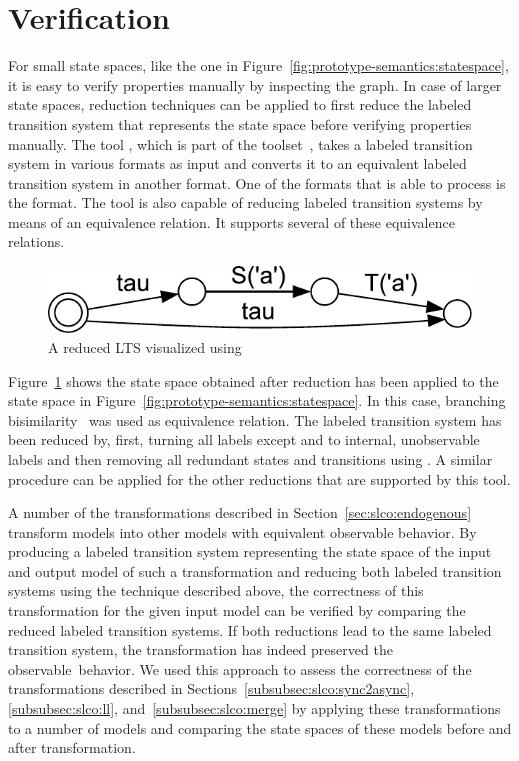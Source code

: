 \section{Verification}
\label{sec:prototype-semantics:verification}

For small state spaces, like the one in Figure~\ref{fig:prototype-semantics:statespace}, it is easy to verify properties manually by inspecting the graph.
In case of larger state spaces, reduction techniques can be applied to first reduce the labeled transition system that represents the state space before verifying properties manually.
The tool \ltsconvert, which is part of the \mCRLTwo toolset~\cite{mcrl2}, takes a labeled transition system in various formats as input and converts it to an equivalent labeled transition system in another format.
One of the formats that \ltsconvert is able to process is the \DOT format.
The tool is also capable of reducing labeled transition systems by means of an equivalence relation.
It supports several of these equivalence relations.

\begin{figure}[hbt]
  \centering
  \includegraphics[scale=.4]{prototype-semantics/figs/statespace_reduced}
  \caption{A reduced LTS visualized using \DOT}
  \label{fig:prototype-semantics:statespace_reduced}
\end{figure}

Figure~\ref{fig:prototype-semantics:statespace_reduced} shows the state space obtained after reduction has been applied to the state space in Figure~\ref{fig:prototype-semantics:statespace}.
In this case, branching bisimilarity~\cite{GlabWeijBisim96} was used as equivalence relation.
The labeled transition system has been reduced by, first, turning all labels except  and  to internal, unobservable labels and then removing all redundant states and transitions using \ltsconvert.
A similar procedure can be applied for the other reductions that are supported by this tool.

A number of the transformations described in Section~\ref{sec:slco:endogenous} transform \SLCO models into other \SLCO models with equivalent observable behavior.
By producing a labeled transition system representing the state space of the input and output model of such a transformation and reducing both labeled transition systems using the technique described above, the correctness of this transformation for the given input model can be verified by comparing the reduced labeled transition systems.
If both reductions lead to the same labeled transition system, the transformation has indeed preserved the observable~behavior.
We used this approach to assess the correctness of the transformations described in Sections~\ref{subsubsec:slco:sync2async}, \ref{subsubsec:slco:ll}, and~\ref{subsubsec:slco:merge} by applying these transformations to a number of models and comparing the state spaces of these models before and after transformation.

